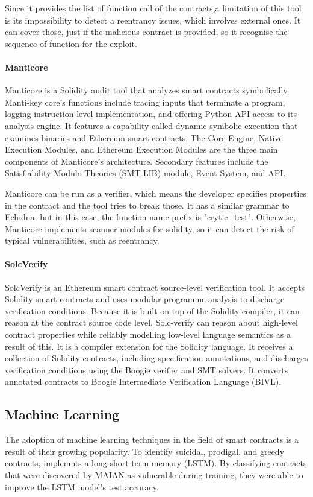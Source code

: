 \documentclass[a4paper,sigconf, language=french,
language=german, language=spanish, language=english]{acmart}
\begin{document}
Since it provides the list of function call of the contracts,a limitation of this tool is its impossibility to detect a reentrancy issues, which involves external ones. It can cover those, just if the malicious contract is provided, so it recognise the sequence of function for the exploit.

\paragraph{Manticore} 
Manticore is a Solidity audit tool that analyzes smart contracts symbolically.
Manti-key core's functions include tracing inputs that terminate a program, logging instruction-level implementation, and offering Python API access to its analysis engine.
It features a capability called dynamic symbolic execution that examines binaries and Ethereum smart contracts.
The Core Engine, Native Execution Modules, and Ethereum Execution Modules are the three main components of Manticore's architecture.
Secondary features include the Satisfiability Modulo Theories (SMT-LIB) module, Event System, and API. 

Manticore can be run as a verifier, which means the developer specifies properties in the contract and the tool tries to break those. It has a similar grammar to Echidna, but in this case, the function name prefix is "crytic\_test". Otherwise, Manticore implements scanner modules for solidity, so it can detect the risk of typical vulnerabilities, such as reentrancy.

\paragraph{SolcVerify} 
SolcVerify is an Ethereum smart contract source-level verification tool.
It accepts Solidity smart contracts and uses modular programme analysis to discharge verification conditions.
Because it is built on top of the Solidity compiler, it can reason at the contract source code level.
Solc-verify can reason about high-level contract properties while reliably modelling low-level language semantics as a result of this.
It is a compiler extension for the Solidity language.
It receives a collection of Solidity contracts, including specification annotations, and discharges verification conditions using the Boogie verifier and SMT solvers.
It converts annotated contracts to Boogie Intermediate Verification Language (BIVL).

\subsection{Machine Learning}
The adoption of machine learning techniques in the field of smart contracts is a result of their growing popularity. To identify suicidal, prodigal, and greedy contracts, \cite{MLAnalysis} implemnts a long-short term memory (LSTM).
By classifying contracts that were discovered by MAIAN as vulnerable during training, they were able to improve the LSTM model's test accuracy. 
\end{document}
